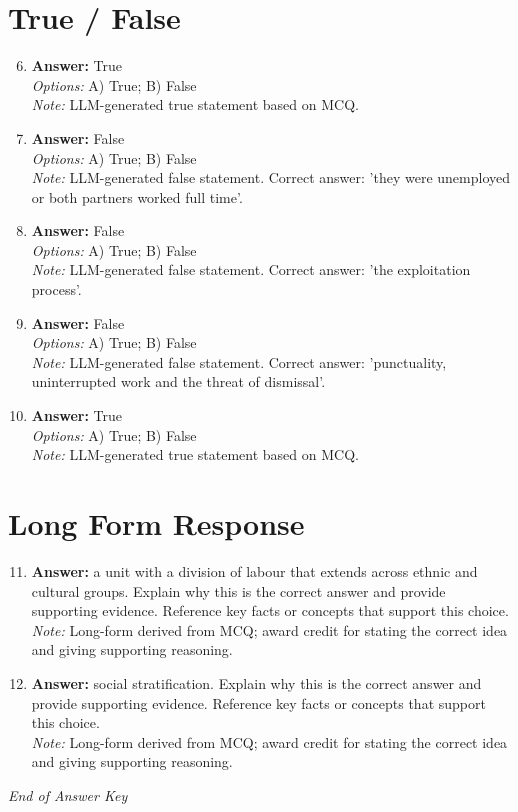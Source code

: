 \documentclass[12pt]{article}
\begin{document}
\section*{True / False}
\begin{enumerate}[label=\arabic*.]
\setcounter{enumi}{5}
\item \textbf{Answer:} True
\\ \textit{Options:} A) True; B) False
\\ \textit{Note:} LLM-generated true statement based on MCQ.
\item \textbf{Answer:} False
\\ \textit{Options:} A) True; B) False
\\ \textit{Note:} LLM-generated false statement. Correct answer: 'they were unemployed or both partners worked full time'.
\item \textbf{Answer:} False
\\ \textit{Options:} A) True; B) False
\\ \textit{Note:} LLM-generated false statement. Correct answer: 'the exploitation process'.
\item \textbf{Answer:} False
\\ \textit{Options:} A) True; B) False
\\ \textit{Note:} LLM-generated false statement. Correct answer: 'punctuality, uninterrupted work and the threat of dismissal'.
\item \textbf{Answer:} True
\\ \textit{Options:} A) True; B) False
\\ \textit{Note:} LLM-generated true statement based on MCQ.
\end{enumerate}

\section*{Long Form Response}
\begin{enumerate}[label=\arabic*.]
\setcounter{enumi}{10}
\item \textbf{Answer:} a unit with a division of labour that extends across ethnic and cultural groups. Explain why this is the correct answer and provide supporting evidence. Reference key facts or concepts that support this choice.
\\ \textit{Note:} Long-form derived from MCQ; award credit for stating the correct idea and giving supporting reasoning.
\item \textbf{Answer:} social stratification. Explain why this is the correct answer and provide supporting evidence. Reference key facts or concepts that support this choice.
\\ \textit{Note:} Long-form derived from MCQ; award credit for stating the correct idea and giving supporting reasoning.
\end{enumerate}

\vfill
\noindent\textit{End of Answer Key}
\end{document}
